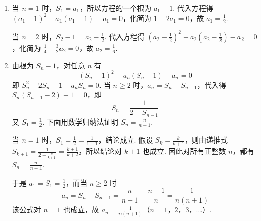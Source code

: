 \begin{solution}
\begin{enumerate}
\item 当 \(n=1\) 时，\(S_1=a_1\)，所以方程的一个根为 \(a_1-1\). 代入方程得
\((a_1-1)^2-a_1(a_1-1)-a_1=0\)，化简为 \(1-2a_1=0\)，故 \(a_1=\frac12\).

当 \(n=2\) 时，\(S_2-1=a_2-\frac12\). 代入方程得
\(\left(a_2-\frac12\right)^2-a_2\left(a_2-\frac12\right)-a_2=0\)，化简为 \(\frac14-\frac32a_2=0\)，故 \(a_2=\frac16\).
\item 由根为 \(S_n-1\)，对任意 \(n\) 有
\[
(S_n-1)^2-a_n(S_n-1)-a_n=0
\]
即 \(S_n^2-2S_n+1-a_nS_n=0\). 当 \(n\geq2\) 时，\(a_n=S_n-S_{n-1}\)，代入得
\(S_n(S_{n-1}-2)+1=0\)，即
\[
S_n=\frac1{2-S_{n-1}}
\]
又 \(S_1=\frac12\). 下面用数学归纳法证明 \(S_n=\frac{n}{n+1}\).

当 \(n=1\) 时，\(S_1=\frac12=\frac1{1+1}\)，结论成立. 假设 \(S_k=\frac{k}{k+1}\)，则由递推式
\(S_{k+1}=\frac1{2-\frac{k}{k+1}}=\frac{k+1}{k+2}\)，所以结论对 \(k+1\) 也成立. 因此对所有正整数 \(n\)，都有 \(S_n=\frac{n}{n+1}\).

于是 \(a_1=S_1=\frac12\)，而当 \(n\geq2\) 时
\[
a_n=S_n-S_{n-1}=\frac{n}{n+1}-\frac{n-1}{n}=\frac1{n(n+1)}
\]
该公式对 \(n=1\) 也成立，故 \(a_n=\frac1{n(n+1)}\)（\(n=1\)，\(2\)，\(3\)，\(\dots\)）.
\end{enumerate}
\end{solution}

